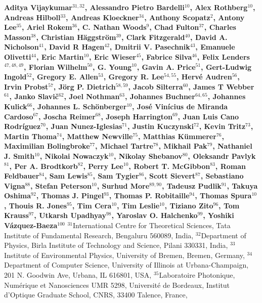 
{\bfseries
Aditya Vijaykumar$^{31,32}$, 
Alessandro Pietro Bardelli$^{10}$, 
Alex Rothberg$^{10}$, 
Andreas Hilboll$^{33}$, 
Andreas Kloeckner$^{34}$, 
Anthony Scopatz$^{2}$, 
Antony Lee$^{35}$, 
Ariel Rokem$^{36}$, 
C. Nathan Woods$^{9}$, 
Chad Fulton$^{37}$, 
Charles Masson$^{38}$, 
Christian H\"aggstr\"om$^{39}$, 
Clark Fitzgerald$^{40}$, 
David A. Nicholson$^{41}$, 
David R Hagen$^{42}$, 
Dmitrii V. Pasechnik$^{43}$, 
Emanuele Olivetti$^{44}$, 
Eric Martin$^{10}$, 
Eric Wieser$^{45}$, 
Fabrice Silva$^{46}$, 
Felix Lenders$^{47,48,49}$, 
Florian Wilhelm$^{50}$, 
G. Young$^{10}$, 
Gavin A. Price$^{51}$, 
Gert-Ludwig Ingold$^{52}$, 
Gregory E. Allen$^{53}$, 
Gregory R. Lee$^{54,55}$, 
Herv\'e Audren$^{56}$, 
Irvin Probst$^{57}$, 
J\"org P. Dietrich$^{58,59}$, 
Jacob Silterra$^{60}$, 
James T Webber$^{61}$, 
Janko Slavi\v{c}$^{62}$, 
Joel Nothman$^{63}$, 
Johannes Buchner$^{64,65}$, 
Johannes Kulick$^{66}$, 
Johannes L. Sch\"{o}nberger$^{10}$, 
Jos\'e Vin\'icius de Miranda Cardoso$^{67}$, 
Joscha Reimer$^{68}$, 
Joseph Harrington$^{69}$, 
Juan Luis Cano Rodr\'iguez$^{70}$, 
Juan Nunez-Iglesias$^{71}$, 
Justin Kuczynski$^{72}$, 
Kevin Tritz$^{73}$, 
Martin Thoma$^{74}$, 
Matthew Newville$^{75}$, 
Matthias K\"ummerer$^{76}$, 
Maximilian Bolingbroke$^{77}$, 
Michael Tartre$^{78}$, 
Mikhail Pak$^{79}$, 
Nathaniel J. Smith$^{10}$, 
Nikolai Nowaczyk$^{10}$, 
Nikolay Shebanov$^{80}$, 
Oleksandr Pavlyk$^{81}$, 
Per A. Brodtkorb$^{82}$, 
Perry Lee$^{10}$, 
Robert T. McGibbon$^{83}$, 
Roman Feldbauer$^{84}$, 
Sam Lewis$^{85}$, 
Sam Tygier$^{86}$, 
Scott Sievert$^{87}$, 
Sebastiano Vigna$^{88}$, 
Stefan Peterson$^{10}$, 
Surhud More$^{89,90}$, 
Tadeusz Pudlik$^{91}$, 
Takuya Oshima$^{92}$, 
Thomas J. Pingel$^{93}$, 
Thomas P. Robitaille$^{94}$, 
Thomas Spura$^{10}$, 
Thouis R. Jones$^{95}$, 
Tim Cera$^{10}$, 
Tim Leslie$^{10}$, 
Tiziano Zito$^{96}$, 
Tom Krauss$^{97}$, 
Utkarsh Upadhyay$^{98}$, 
Yaroslav O. Halchenko$^{99}$, 
Yoshiki V\'azquez-Baeza$^{100}$
}
\newline
\hfill \break
$^{31}$International Centre for Theoretical Sciences, Tata Institute of Fundamental Research, Bengaluru 560089, India, 
$^{32}$Department of Physics, Birla Institute of Technology and Science, Pilani 330331, India, 
$^{33}$Institute of Environmental Physics, University of Bremen, Bremen, Germany, 
$^{34}$Department of Computer Science, University of Illinois at Urbana-Champaign, 201 N. Goodwin Ave, Urbana, IL 616801, USA, 
$^{35}$Laboratoire Photonique, Num\'erique et Nanosciences UMR 5298, Universit\'e de Bordeaux, Institut d'Optique Graduate School, CNRS, 33400 Talence, France, 
